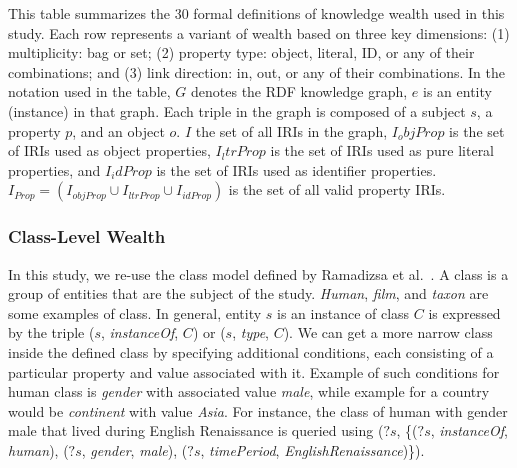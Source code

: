 \begin{center}
{\begin{threeparttable}
\begin{tabular}{|c | c c c c c c |}
    \bottomrule
    \end{tabular}
    \begin{tablenotes}
        \scriptsize
        \item{This table summarizes the 30 formal definitions of knowledge wealth used in this study. Each row represents a variant of wealth based on three key dimensions: (1) multiplicity: bag or set; (2) property type: object, literal, ID, or any of their combinations; and (3) link direction: in, out, or any of their combinations. In the notation used in the table, \(G\) denotes the RDF knowledge graph, \(e\) is an entity (instance) in that graph. Each triple in the graph is composed of a subject \(s\), a property \(p\), and an object \(o\). \(I\) the set of all IRIs in the graph, \(I_objProp\) is the set of IRIs used as object properties, \(I_ltrProp\) is the set of IRIs used as pure literal properties, and \(I_idProp\) is the set of IRIs used as identifier properties. \(I_{Prop} = (I_{objProp} \cup I_{ltrProp} \cup I_{idProp})\) is the set of all valid property IRIs.}
    \end{tablenotes}
    \end{threeparttable}
    }
\end{center}

\subsubsection{Class-Level Wealth}
In this study, we re-use the class model defined by Ramadizsa et al.~\cite{RamadizsaDNR23}. A class is a group of entities that are the subject of the study. \textit{Human}, \textit{film}, and \textit{taxon} are some examples of class. In general, entity \(s\) is an instance of class \(C\) is expressed by the triple (\(s\), \textit{instanceOf}, \(C\)) or (\(s\), \textit{type}, \(C\)). We can get a more narrow class inside the defined class by specifying additional conditions, each consisting of a particular property and value associated with it. Example of such conditions for human class is \textit{gender} with associated value \textit{male}, while example for a country would be \textit{continent} with value \textit{Asia}. For instance, the class of human with gender male that lived during English Renaissance is queried using (\(?s\), \{(\(?s\), \textit{instanceOf}, \textit{human}), (\(?s\), \textit{gender}, \textit{male}), (\(?s\), \textit{timePeriod}, \textit{EnglishRenaissance})\}).


